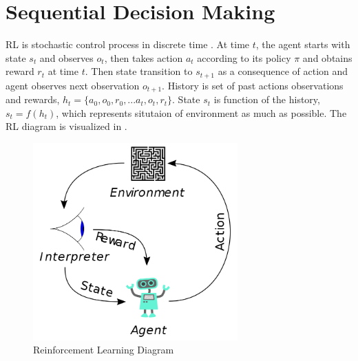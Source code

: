 \section{Sequential Decision Making}
RL is stochastic control process in discrete time \cite{sutton_reinforcement_1998}. At time $t$, the agent starts with state $s_t$ and observes $o_t$, then takes action $a_t$ according to its policy $\pi$ and obtains reward $r_t$ at time $t$. Then state transition to $s_{t+1}$ as a consequence of action and agent observes next observation $o_{t+1}$. History is set of past actions observations and rewards, $h_t=\{ a_0, o_0, r_0, ... a_t, o_t, r_t\}$. State $s_t$ is function of the history, $s_t=f(h_t)$, which represents situtaion of environment as much as possible. The RL diagram is visualized in . \\
\begin{figure}
	\centering
	\includegraphics[width=0.7\textwidth]{figures/ml_theory/RL_diagram.png}
	\caption{Reinforcement Learning Diagram}
	\label{fig:rl_diagram}
\end{figure}

